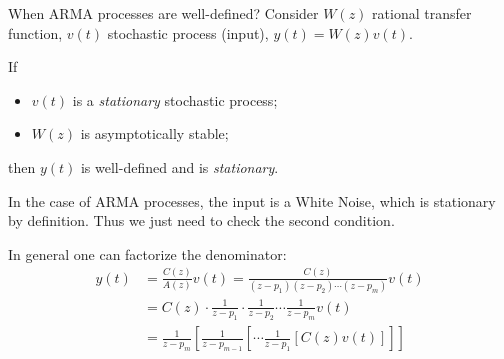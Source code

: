 \documentclass[10pt,a4paper,twoside,openright]{book}
\begin{document}
When ARMA processes are well-defined? Consider $W(z)$ rational transfer function, $v(t)$ stochastic process (input), $y(t)=W(z)v(t)$.

\begin{theorem}
	If
	\begin{itemize}
		\item $v(t)$ is a \emph{stationary} stochastic process;
		\item $W(z)$ is asymptotically stable;
	\end{itemize}
	then $y(t)$ is well-defined and is \emph{stationary}.
\end{theorem}

In the case of ARMA processes, the input is a White Noise, which is stationary by definition. Thus we just need to check the second condition.

In general one can factorize the denominator:
\begin{align*}
	y(t)&=\frac{C(z)}{A(z)}v(t)=\frac{C(z)}{(z-p_{1})(z-p_{2})\cdots(z-p_{m})}v(t)\\
	&=C(z)\cdot\frac{1}{z-p_{1}}\cdot\frac{1}{z-p_{2}}\cdots\frac{1}{z-p_{m}}v(t)\\
	&=\frac{1}{z-p_{m}}\left[ \frac{1}{z-p_{m-1}}\left[ \cdots\frac{1}{z-p_{1}}\left[ C(z)v(t) \right]   \right]   \right]  
\end{align*}
\end{document}
